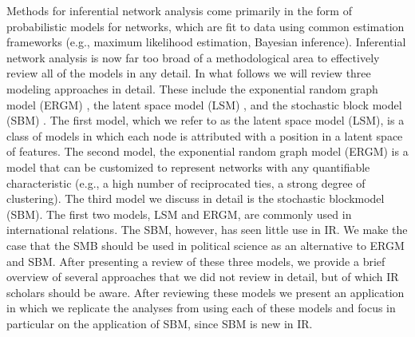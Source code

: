 \documentclass[fleqn,12pt]{wlscirep}
\begin{document}
Methods for inferential network analysis come primarily in the form of probabilistic models for networks, which are fit to data using common estimation frameworks (e.g., maximum likelihood estimation, Bayesian inference). Inferential network analysis is now far too broad of a methodological area to effectively review all of the models in any detail. In what follows we will review three modeling approaches in detail. These include the exponential random graph model (ERGM) \citep{cranmer2011inferential}, the latent space model (LSM) \citep{dorff2016latent},  and the stochastic block model (SBM) \citep{latouche2011overlapping}. The first model, which we refer to as the latent space model (LSM), is a class of models in which each node is attributed with a position in a latent space of features. The second model, the exponential random graph model (ERGM) is a model that can be customized to represent networks with any quantifiable characteristic (e.g., a high number of reciprocated ties, a strong degree of clustering).  The third model we discuss in detail is the stochastic blockmodel (SBM). The first two models, LSM and ERGM, are commonly used in international relations. The SBM, however, has seen little use in IR. We make the case that the SMB should be used in political science as an alternative to ERGM and SBM. After presenting a review of these three models, we provide a brief overview of several approaches that we did not review in detail, but of which IR scholars should be aware. After reviewing these models we present an application in which we replicate the analyses from  using each of these models and focus in particular on the application of SBM, since SBM is new in IR.
\end{document}
